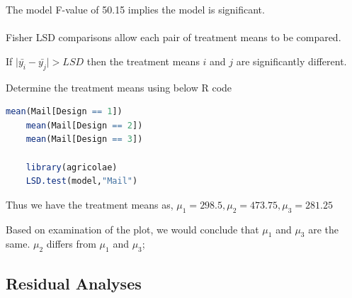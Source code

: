 \documentclass[11pt]{article}
\begin{document}
The model F-value of 50.15 implies the model is significant.

\paragraph{}
Fisher LSD comparisons allow each pair of treatment means to be compared. 

If $\displaystyle \mid \bar{y_i} - \bar{y_j} \mid > LSD$ then the treatment means  $\displaystyle i$ and $\displaystyle j$ are significantly different. 

Determine the treatment means using below R code

\begin{lstlisting}[language=R]
    mean(Mail[Design == 1])
    mean(Mail[Design == 2])
    mean(Mail[Design == 3])  
    
    library(agricolae)
    LSD.test(model,"Mail")
\end{lstlisting}



Thus we have the treatment means as,
$\displaystyle \mu_1=298.5, \mu_2=473.75, \mu_3=281.25$

Based on examination of the plot, we would conclude that 
$\displaystyle \mu_1$ and $\displaystyle \mu_3$ are the same.
$\displaystyle \mu_2$ differs from $\displaystyle \mu_1$ and $\displaystyle \mu_3$;

\subsection{Residual Analyses}
\end{document}
